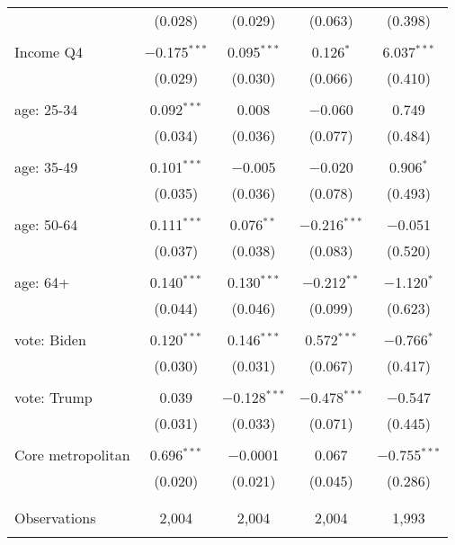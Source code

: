 \begin{tabular}{@{\extracolsep{5pt}}lcccc}
  & (0.028) & (0.029) & (0.063) & (0.398) \\ 
  & & & & \\ 
 Income Q4 & $-$0.175$^{***}$ & 0.095$^{***}$ & 0.126$^{*}$ & 6.037$^{***}$ \\ 
  & (0.029) & (0.030) & (0.066) & (0.410) \\ 
  & & & & \\ 
 age: 25-34 & 0.092$^{***}$ & 0.008 & $-$0.060 & 0.749 \\ 
  & (0.034) & (0.036) & (0.077) & (0.484) \\ 
  & & & & \\ 
 age: 35-49 & 0.101$^{***}$ & $-$0.005 & $-$0.020 & 0.906$^{*}$ \\ 
  & (0.035) & (0.036) & (0.078) & (0.493) \\ 
  & & & & \\ 
 age: 50-64 & 0.111$^{***}$ & 0.076$^{**}$ & $-$0.216$^{***}$ & $-$0.051 \\ 
  & (0.037) & (0.038) & (0.083) & (0.520) \\ 
  & & & & \\ 
 age: 64+ & 0.140$^{***}$ & 0.130$^{***}$ & $-$0.212$^{**}$ & $-$1.120$^{*}$ \\ 
  & (0.044) & (0.046) & (0.099) & (0.623) \\ 
  & & & & \\ 
 vote: Biden & 0.120$^{***}$ & 0.146$^{***}$ & 0.572$^{***}$ & $-$0.766$^{*}$ \\ 
  & (0.030) & (0.031) & (0.067) & (0.417) \\ 
  & & & & \\ 
 vote: Trump & 0.039 & $-$0.128$^{***}$ & $-$0.478$^{***}$ & $-$0.547 \\ 
  & (0.031) & (0.033) & (0.071) & (0.445) \\ 
  & & & & \\ 
 Core metropolitan & 0.696$^{***}$ & $-$0.0001 & 0.067 & $-$0.755$^{***}$ \\ 
  & (0.020) & (0.021) & (0.045) & (0.286) \\ 
  & & & & \\ 
\hline \\[-1.8ex] 

Observations & 2,004 & 2,004 & 2,004 & 1,993 \\ 
\hline 
\hline \\[-1.8ex] 
\end{tabular} 